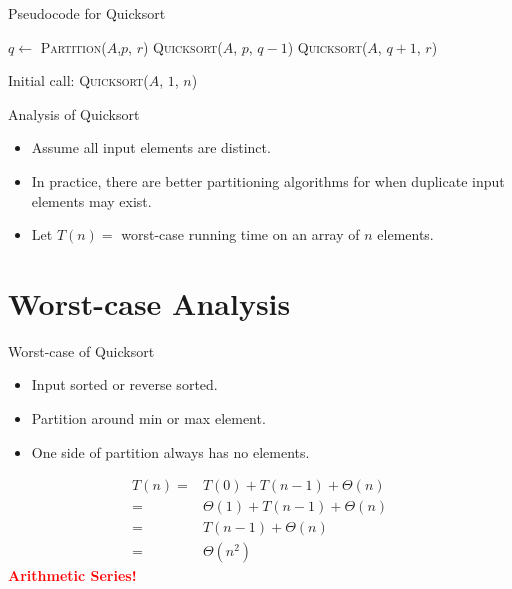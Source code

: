 \documentclass{beamer}
\begin{document}
\begin{frame}{Pseudocode for Quicksort}
        \begin{algorithm}[H]
            \begin{algorithmic}[1]
                        \State $q \leftarrow$ \textsc{Partition}($A$,$p$, $r$)
                        \State \textsc{Quicksort}($A$, $p$, $q - 1$)
                        \State \textsc{Quicksort}($A$, $q + 1$, $r$)
                    \EndIf
                \EndProcedure
            \end{algorithmic}
        \end{algorithm}
        \begin{alertblock}{Initial call:}
            \textsc{Quicksort}($A$, $1$, $n$)
        \end{alertblock}
\end{frame}

\begin{frame}{Analysis of Quicksort}
    \begin{itemize}
        \item Assume all input elements are distinct.
        \item In practice, there are better partitioning algorithms for when duplicate input elements may exist.
        \item Let $T(n) =$ worst-case running time on an array of $n$ elements.
    \end{itemize}
\end{frame}

\section{Worst-case Analysis}

\begin{frame}{Worst-case of Quicksort}
    \begin{itemize}
        \item Input sorted or reverse sorted.
        \item Partition around min or max element.
        \item One side of partition always has no elements.
    \end{itemize}
    \begin{equation*}
        \begin{split}
            T(n) =& T(0) + T(n - 1) + \Theta(n) \\
                    =& \Theta(1) + T(n - 1) + \Theta(n) \\
                    =& T(n - 1) + \Theta(n) \\
                    =& \Theta(n^2)
        \end{split}
    \end{equation*}
    \pause
    \centering
    \textcolor{red}{\textbf{Arithmetic Series!}}
\end{frame}
\end{document}
